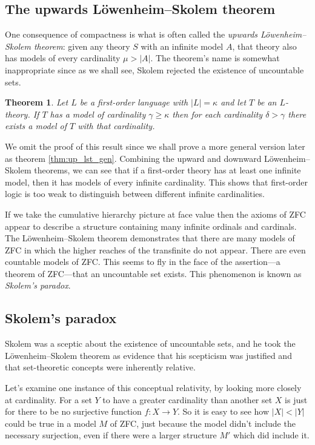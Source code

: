 \documentclass[10pt, a4paper, oneside]{article}
\newtheorem{thm}{Theorem}[section]
\theoremstyle{definition}
\theoremstyle{remark}
\theoremstyle{plain}
\theoremstyle{plain}
\begin{document}
\subsection{The upwards Löwenheim--Skolem theorem}

One consequence of compactness is what is often called the \emph{upwards
Löwenheim--Skolem theorem}: given any theory $S$ with an infinite model $A$,
that theory also has models of every cardinality $\mu > |A|$. The theorem's
name is somewhat inappropriate since as we shall see, Skolem rejected the
existence of uncountable sets.

\begin{thm}
    Let $L$ be a first-order language with $|L| = \kappa$ and let $T$ be an
    $L$-theory. If $T$ has a model of cardinality $\gamma \geq \kappa$ then for
    each cardinality $\delta > \gamma$ there exists a model of $T$ with that
    cardinality.
\end{thm}

We omit the proof of this result since we shall prove a more general version
later as theorem \ref{thm:up_lst_gen}. Combining the upward and downward
Löwenheim--Skolem theorems, we can see that if a first-order theory has at
least one infinite model, then it has models of every infinite cardinality. This
shows that first-order logic is too weak to distinguish between different
infinite cardinalities.

If we take the cumulative hierarchy picture at face value then the axioms of ZFC
appear to describe a structure containing many infinite ordinals and cardinals.
The Löwenheim--Skolem theorem demonstrates that there are many models of ZFC in
which the higher reaches of the transfinite do not appear. There are even
countable models of ZFC. This seems to fly in the face of the assertion---a
theorem of ZFC---that an uncountable set exists. This phenomenon is known as
\emph{Skolem's paradox}.

\subsection{Skolem's paradox}

Skolem was a sceptic about the existence of uncountable sets, and he took the
Löwenheim--Skolem theorem as evidence that his scepticism was justified and
that set-theoretic concepts were inherently relative.

Let's examine one instance of this conceptual relativity, by looking more
closely at cardinality. For a set $Y$ to have a greater cardinality than another
set $X$ is just for there to be no surjective function $f : X \rightarrow Y$. So
it is easy to see how $|X| < |Y|$ could be true in a model $M$ of ZFC, just
because the model didn't include the necessary surjection, even if there were a
larger structure $M'$ which did include it.
\end{document}

